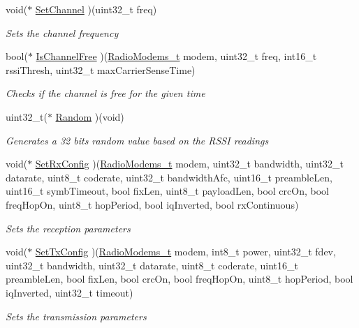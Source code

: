 \begin{DoxyCompactItemize}
void($\ast$ \mbox{\hyperlink{struct_radio__s_a691bfd16e5be0274cbfe0d7454749f12}{Set\+Channel}} )(uint32\+\_\+t freq)
\begin{DoxyCompactList}\small\item\em Sets the channel frequency \end{DoxyCompactList}\item 
bool($\ast$ \mbox{\hyperlink{struct_radio__s_a4c8c593c3c380636ec2ca7c452d59281}{Is\+Channel\+Free}} )(\mbox{\hyperlink{radio_8h_a992ef7a5b7f52975ba7bd8dd97740057}{Radio\+Modems\+\_\+t}} modem, uint32\+\_\+t freq, int16\+\_\+t rssi\+Thresh, uint32\+\_\+t max\+Carrier\+Sense\+Time)
\begin{DoxyCompactList}\small\item\em Checks if the channel is free for the given time \end{DoxyCompactList}\item 
uint32\+\_\+t($\ast$ \mbox{\hyperlink{struct_radio__s_a334bf05b91b26c5e6faf6bbf6737eab9}{Random}} )(void)
\begin{DoxyCompactList}\small\item\em Generates a 32 bits random value based on the R\+S\+SI readings \end{DoxyCompactList}\item 
void($\ast$ \mbox{\hyperlink{struct_radio__s_ae4e2616b2534ce84bf4110dc6d31f82f}{Set\+Rx\+Config}} )(\mbox{\hyperlink{radio_8h_a992ef7a5b7f52975ba7bd8dd97740057}{Radio\+Modems\+\_\+t}} modem, uint32\+\_\+t bandwidth, uint32\+\_\+t datarate, uint8\+\_\+t coderate, uint32\+\_\+t bandwidth\+Afc, uint16\+\_\+t preamble\+Len, uint16\+\_\+t symb\+Timeout, bool fix\+Len, uint8\+\_\+t payload\+Len, bool crc\+On, bool freq\+Hop\+On, uint8\+\_\+t hop\+Period, bool iq\+Inverted, bool rx\+Continuous)
\begin{DoxyCompactList}\small\item\em Sets the reception parameters \end{DoxyCompactList}\item 
void($\ast$ \mbox{\hyperlink{struct_radio__s_a52823b01ffc876df28bf986abc706db7}{Set\+Tx\+Config}} )(\mbox{\hyperlink{radio_8h_a992ef7a5b7f52975ba7bd8dd97740057}{Radio\+Modems\+\_\+t}} modem, int8\+\_\+t power, uint32\+\_\+t fdev, uint32\+\_\+t bandwidth, uint32\+\_\+t datarate, uint8\+\_\+t coderate, uint16\+\_\+t preamble\+Len, bool fix\+Len, bool crc\+On, bool freq\+Hop\+On, uint8\+\_\+t hop\+Period, bool iq\+Inverted, uint32\+\_\+t timeout)
\begin{DoxyCompactList}\small\item\em Sets the transmission parameters \end{DoxyCompactList}\item 

\end{DoxyCompactItemize}
